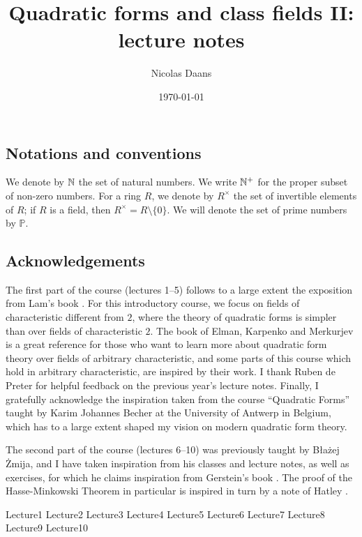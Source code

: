 \documentclass[12pt, leqno, british]{amsart}
\title{Quadratic forms and class fields II: lecture notes}
\author{Nicolas Daans}
\date{\today}
\begin{document}
\maketitle
\tableofcontents

\subsection*{Notations and conventions}
We denote by $\mathbb N$ the set of natural numbers.
We write $\mathbb N^+$ for the proper subset of non-zero numbers.
For a ring $R$, we denote by $R^\times$ the set of invertible elements of $R$; if $R$ is a field, then $R^\times = R \setminus \lbrace 0 \rbrace$.
We will denote the set of prime numbers by $\mathbb{P}$.

\subsection*{Acknowledgements}
The first part of the course (lectures 1--5) follows to a large extent the exposition from Lam's book \autocite{Lam}.
For this introductory course, we focus on fields of characteristic different from $2$, where the theory of quadratic forms is simpler than over fields of characteristic $2$.
The book of Elman, Karpenko and Merkurjev \autocite{ElmanKarpenkoMerkurjev} is a great reference for those who want to learn more about quadratic form theory over fields of arbitrary characteristic, and some parts of this course which hold in arbitrary characteristic, are inspired by their work.
I thank Ruben de Preter for helpful feedback on the previous year's lecture notes.
Finally, I gratefully acknowledge the inspiration taken from the course ``Quadratic Forms'' taught by Karim Johannes Becher at the University of Antwerp in Belgium, which has to a large extent shaped my vision on modern quadratic form theory.

The second part of the course (lectures 6--10) was previously taught by B{\l}a{\.z}ej {\.Z}mija, and I have taken inspiration from his classes and lecture notes, as well as exercises, for which he claims inspiration from Gerstein's book \cite{Gerstein}.
The proof of the Hasse-Minkowski Theorem in particular is inspired in turn by a note of Hatley \cite{Hat}.

{Lecture1}
{Lecture2}
{Lecture3}
{Lecture4}
{Lecture5}
{Lecture6}
{Lecture7}
{Lecture8}
{Lecture9}
{Lecture10}

\printindex
\printbibliography
\end{document}
